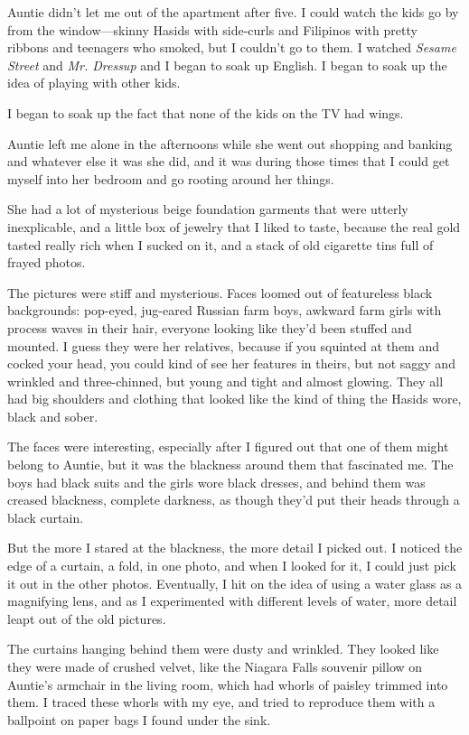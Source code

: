 \documentclass{article}
\begin{document}
Auntie didn't let me out of the apartment after five.  I could watch
the kids go by from the window---skinny Hasids with side-curls and
Filipinos with pretty ribbons and teenagers who smoked, but I couldn't
go to them.  I watched \textit{Sesame Street} and \textit{Mr. 
Dressup} and I began to soak up English.  I began to soak up the idea
of playing with other kids.

I began to soak up the fact that none of the kids on the TV had wings.

Auntie left me alone in the afternoons while she went out shopping and
banking and whatever else it was she did, and it was during those
times that I could get myself into her bedroom and go rooting around
her things.

She had a lot of mysterious beige foundation garments that were
utterly inexplicable, and a little box of jewelry that I liked to
taste, because the real gold tasted really rich when I sucked on it,
and a stack of old cigarette tins full of frayed photos.

The pictures were stiff and mysterious.  Faces loomed out of
featureless black backgrounds:  pop-eyed, jug-eared Russian farm boys,
awkward farm girls with process waves in their hair, everyone looking
like they'd been stuffed and mounted.  I guess they were her
relatives, because if you squinted at them and cocked your head, you
could kind of see her features in theirs, but not saggy and wrinkled
and three-chinned, but young and tight and almost glowing.  They all
had big shoulders and clothing that looked like the kind of thing the
Hasids wore, black and sober.

The faces were interesting, especially after I figured out that one of
them might belong to Auntie, but it was the blackness around them that
fascinated me.  The boys had black suits and the girls wore black
dresses, and behind them was creased blackness, complete darkness, as
though they'd put their heads through a black curtain.

But the more I stared at the blackness, the more detail I picked out. 
I noticed the edge of a curtain, a fold, in one photo, and when I
looked for it, I could just pick it out in the other photos. 
Eventually, I hit on the idea of using a water glass as a magnifying
lens, and as I experimented with different levels of water, more
detail leapt out of the old pictures.

The curtains hanging behind them were dusty and wrinkled.  They looked
like they were made of crushed velvet, like the Niagara Falls souvenir
pillow on Auntie's armchair in the living room, which had whorls of
paisley trimmed into them.  I traced these whorls with my eye, and
tried to reproduce them with a ballpoint on paper bags I found under
the sink.
\end{document}

